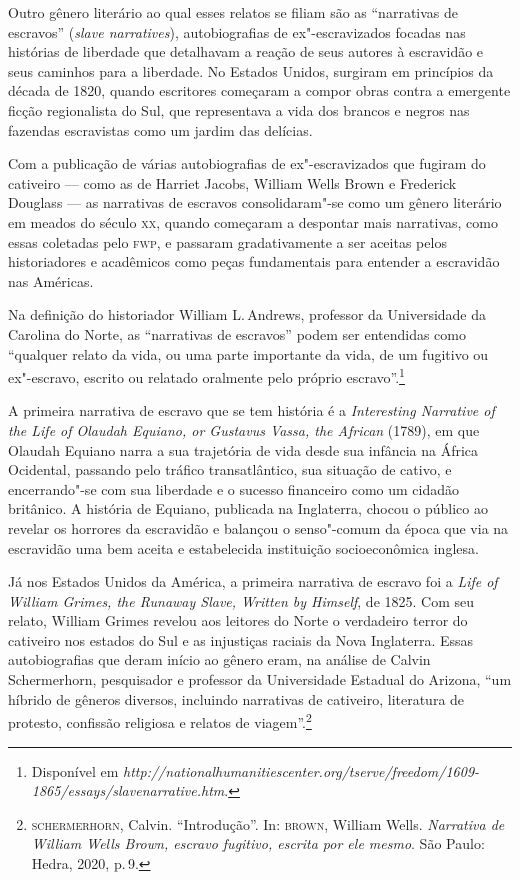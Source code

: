 Outro gênero literário ao qual esses relatos se filiam são as ``narrativas de escravos''
(\textit{slave narratives}), autobiografias de ex"-escravizados focadas nas histórias de liberdade que detalhavam a reação de seus autores à escravidão e seus caminhos para a liberdade. No Estados Unidos, surgiram em princípios da década de 1820, quando escritores começaram a compor obras contra a emergente ficção regionalista do Sul, que representava a vida dos brancos e negros nas fazendas escravistas como um jardim das delícias.

Com a publicação de várias autobiografias de ex"-escravizados que fugiram do cativeiro --- como as de Harriet Jacobs, William Wells Brown e Frederick Douglass --- as narrativas de escravos consolidaram"-se como um gênero literário em meados do século \textsc{xx}, quando começaram a despontar mais narrativas, como essas coletadas pelo \textsc{fwp}, e passaram gradativamente a ser aceitas pelos historiadores e acadêmicos como peças fundamentais para entender a escravidão nas Américas.

Na definição do historiador William L.\,Andrews, professor da Universidade da Carolina do Norte, as ``narrativas de escravos'' podem ser entendidas como ``qualquer relato da vida, ou uma parte importante da vida, de um fugitivo ou ex"-escravo, escrito ou relatado oralmente pelo próprio escravo''.\footnote{Disponível em \emph{http://nationalhumanitiescenter.org/tserve/freedom/1609-1865/essays/slavenarrative.htm}.}


A primeira narrativa de escravo que se tem história é a 
\textit{Interesting Narrative of the Life of Olaudah Equiano, or Gustavus Vassa, the African}
(1789), em que Olaudah Equiano narra a sua trajetória de vida desde sua infância na África Ocidental, passando pelo tráfico transatlântico, sua situação de cativo, e encerrando"-se com sua liberdade e o sucesso financeiro como um cidadão britânico.
A história de Equiano, publicada na Inglaterra, chocou o público ao revelar os horrores da escravidão e balançou o senso"-comum da época que via na escravidão uma bem aceita e estabelecida instituição socioeconômica inglesa.

Já nos Estados Unidos da América, a primeira narrativa de escravo foi a \emph{Life of William Grimes, the Runaway Slave, Written by Himself}, de 1825.
Com seu relato, William Grimes revelou aos leitores do Norte o verdadeiro terror do cativeiro nos estados do Sul e as injustiças raciais da Nova Inglaterra.
Essas autobiografias que deram início ao gênero eram, na análise de Calvin Schermerhorn, pesquisador e professor da Universidade Estadual do Arizona,
``um híbrido de gêneros diversos, incluindo narrativas de cativeiro, literatura de protesto, confissão religiosa e relatos de viagem''.\footnote{\textsc{schermerhorn}, Calvin. ``Introdução''. In: \textsc{brown}, William Wells. \textit{Narrativa de William Wells Brown,
escravo fugitivo, escrita por ele mesmo}. São Paulo: Hedra, 2020, p.\,9.}

